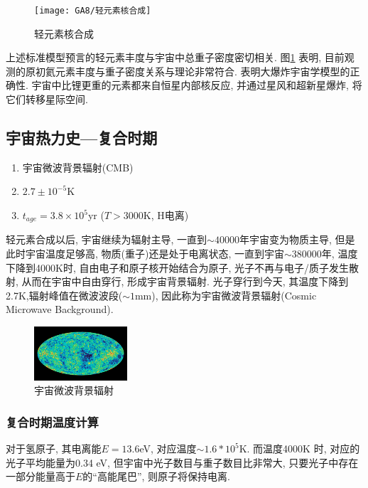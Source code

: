 \begin{figure}[!htb]
    \centering
    \texttt{[image: GA8/轻元素核合成]}
    \caption{轻元素核合成}
    \label{轻元素核合成}
\end{figure}


上述标准模型预言的轻元素丰度与宇宙中总重子密度密切相关. 图\ref{轻元素核合成} 表明, 目前观测的原初氦元素丰度与重子密度关系与理论非常符合. 表明大爆炸宇宙学模型的正确性. 宇宙中比锂更重的元素都来自恒星内部核反应, 并通过星风和超新星爆炸, 将它们转移星际空间. 

\subsection{宇宙热力史---复合时期}

\begin{enumerate}
    \item 宇宙微波背景辐射(CMB)
    \item $2.7\pm 10^{-5}$K
    \item $t_{age}=3.8\times 10^5$yr
    \subitem ($T>3000$K, H电离)
\end{enumerate}

{\small 轻元素合成以后, 宇宙继续为辐射主导, 一直到$\sim 40000$年宇宙变为物质主导, 但是此时宇宙温度足够高, 物质(重子)还是处于电离状态, 一直到宇宙$\sim380000$年, 温度下降到4000K时, 自由电子和原子核开始结合为原子, 光子不再与电子/质子发生散射, 从而在宇宙中自由穿行, 形成宇宙背景辐射. 光子穿行到今天, 其温度下降到2.7K,辐射峰值在微波波段($\sim 1$mm), 因此称为宇宙微波背景辐射(Cosmic Microwave Background). }

\begin{figure}[!htb]
    \centering
    \includegraphics[width=0.309\textwidth]{pic/GA8/CMB.jpg}
    \caption{宇宙微波背景辐射}
\end{figure}

\subsubsection{复合时期温度计算}
对于氢原子, 其电离能$E=13.6$eV, 对应温度$\sim 1.6*10^5 $K. 而温度4000K 时, 对应的光子平均能量为0.34 eV, 但宇宙中光子数目与重子数目比非常大, 只要光子中存在一部分能量高于$E$的``高能尾巴'', 则原子将保持电离. 

